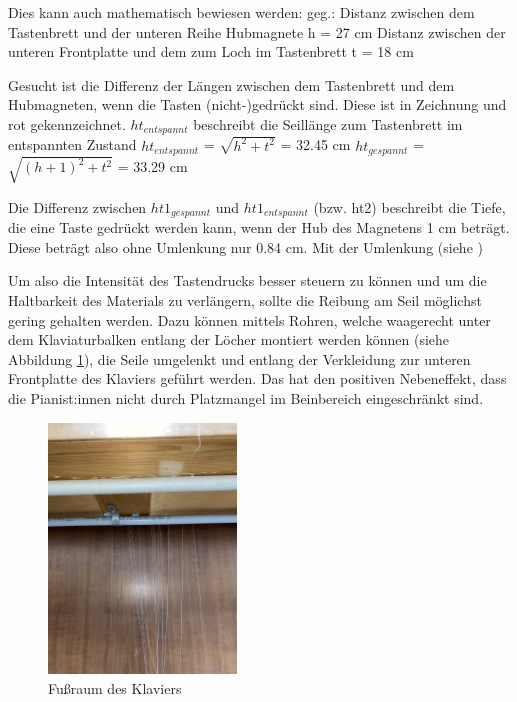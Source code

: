 \newpage
Dies kann auch mathematisch bewiesen werden:
\newline geg.:
\newline Distanz zwischen dem Tastenbrett und der unteren Reihe Hubmagnete h = 27 cm
\newline Distanz zwischen der unteren Frontplatte und dem zum Loch im Tastenbrett t = 18 cm

Gesucht ist die Differenz der Längen zwischen dem Tastenbrett und dem Hubmagneten, wenn die Tasten (nicht-)gedrückt sind.
Diese ist in Zeichnung  und  rot gekennzeichnet.
\newline $ht_{entspannt}$ beschreibt die Seillänge zum Tastenbrett im entspannten Zustand
\newline $ht_{entspannt}$ = $\sqrt {h^{2} + t^{2}}$ = 32.45 cm
\newline $ht_{gespannt}$ = $\sqrt {(h + 1)^{2} + t^{2}}$ = 33.29 cm


Die Differenz zwischen $ht1_{gespannt}$ und $ht1_{entspannt}$ (bzw. ht2) beschreibt die Tiefe,
die eine Taste gedrückt werden kann, wenn der Hub des Magnetens 1 cm beträgt.
\newline Diese beträgt also ohne Umlenkung nur 0.84 cm.
Mit der Umlenkung (siehe )

Um also die Intensität des Tastendrucks besser steuern zu können und um die Haltbarkeit des Materials zu verlängern,
sollte die Reibung am Seil möglichst gering gehalten werden.
Dazu können mittels Rohren, welche waagerecht unter dem Klaviaturbalken entlang der Löcher montiert werden können (siehe Abbildung \ref{fig:fussraum}), die Seile umgelenkt und
entlang der Verkleidung zur unteren Frontplatte des Klaviers geführt werden.
Das hat den positiven Nebeneffekt, dass die Pianist:innen nicht durch Platzmangel im Beinbereich eingeschränkt sind.


\begin{figure}[htbp]
    \centering
    \includegraphics[width=5cm,angle=-90]{img/Fussraum.jpg}
    \caption{Fußraum des Klaviers}
    \label{fig:fussraum}
\end{figure}


